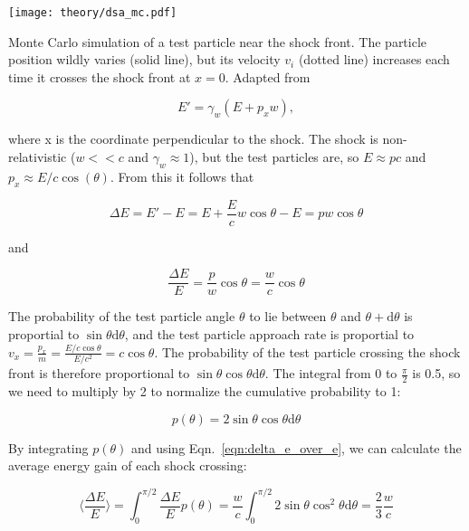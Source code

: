 \begin{marginfigure}
    \texttt{[image: theory/dsa\_mc.pdf]}
    \caption[DSA Monte Carlo]{Monte Carlo simulation of a test particle near the shock front. The particle position wildly varies (solid line), but its velocity $v_i$ (dotted line) increases each time it crosses the shock front at $x=0$. Adapted from~\cite{Baring1997}}
\end{marginfigure}

\begin{equation}
    E' = \gamma_{w}(E+p_x w),
\end{equation}

where x is the coordinate perpendicular to the shock. The shock is non-relativistic ($w<<c$ and $\gamma_w\approx1$), but the test particles are, so $E\approx pc$ and $p_x \approx E/c \cos(\theta)$. From this it follows that

\begin{equation}
    \Delta E = E' - E = E+\frac{E}{c}w\cos{\theta}-E = pw\cos{\theta}
\end{equation}

and

\begin{equation}
    \frac{\Delta E}{E} = \frac{p}{w}\cos{\theta} = \frac{w}{c}\cos{\theta}
    \label{eqn:delta_e_over_e}
\end{equation}

The probability of the test particle angle $\theta$ to lie between $\theta$ and $\theta + \text{d}\theta$ is proportial to $\sin{\theta}\text{d}\theta$, and the test particle approach rate is proportial to $v_x = \frac{p_x}{m} = \frac{E/c\cos{\theta}}{E/c^2} = c \cos{\theta}$. The probability of the test particle crossing the shock front is therefore proportional to $\sin{\theta} \cos{\theta} \text{d}\theta$. The integral from 0 to $\frac{\pi}{2}$ is 0.5, so we need to multiply by 2 to normalize the cumulative probability to 1:

\begin{equation}
    p(\theta) = 2\sin{\theta}\cos{\theta} \text{d}\theta
\end{equation}

By integrating $p(\theta)$ and using Eqn.~\ref{eqn:delta_e_over_e}, we can calculate the average energy gain of each shock crossing:

\begin{equation}
    \bigg\langle \frac{\Delta E}{E} \bigg\rangle = \int_0^{\pi/2} \frac{\Delta E}{E} p(\theta) = \frac{w}{c} \int_0^{\pi/2} 2 \sin{\theta} \cos^2{\theta}  \text{d}\theta = \frac{2}{3}\frac{w}{c}
\end{equation}


